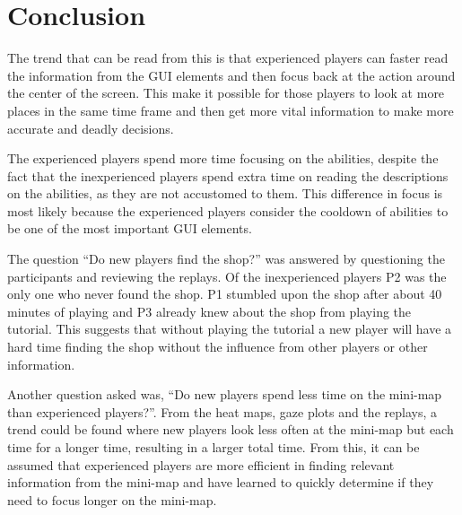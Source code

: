 \documentclass[notitlepage]{report}
\begin{document}
\section{Conclusion}
The trend that can be read from this is that experienced players can faster read the information from the GUI elements and then focus back at the action around the center of the screen. This make it possible for those players to look at more places in the same time frame and then get more vital information to make more accurate and deadly decisions.

The experienced players spend more time focusing on the abilities, despite the fact that the inexperienced players spend extra time on reading the descriptions on the abilities, as they are not accustomed to them. This difference in focus is most likely because the experienced players consider the cooldown of abilities to be one of the most important GUI elements.

The question ``Do new players find the shop?'' was answered by questioning the participants and reviewing the replays. Of the inexperienced players P2 was the only one who never found the shop. P1 stumbled upon the shop after about 40 minutes of playing and P3 already knew about the shop from playing the tutorial. This suggests that without playing the tutorial a new player will have a hard time finding the shop without the influence from other players or other information.

Another question asked was, ``Do new players spend less time on the mini-map than experienced players?''. From the heat maps, gaze plots and the replays, a trend could be found where new players look less often at the mini-map but each time for a longer time, resulting in a larger total time. From this, it can be assumed that experienced players are more efficient in finding relevant information from the mini-map and have learned to quickly determine if they need to focus longer on the mini-map.
\end{document}

